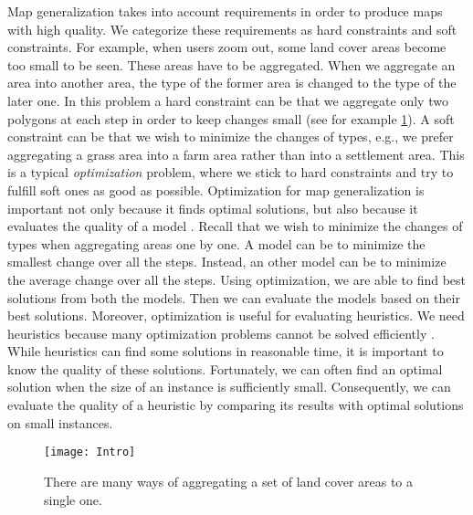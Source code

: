 Map generalization takes into account requirements
in order to produce maps with high quality.
We categorize these requirements as hard constraints 
and soft constraints.
For example, when users zoom out, 
some land cover areas become too small to be seen.
These areas have to be aggregated.
When we aggregate an area into another area, the type of the 
former area is changed to the type of the later one. 
In this problem a hard constraint can be that we aggregate only 
two polygons at each step in order to keep changes small
(see for example \fig\ref{fig:Intro_SubdivisionName}). 
A soft constraint can be that we wish to minimize the changes of 
types, e.g., we prefer aggregating a grass area into a farm 
area rather than into a settlement area.
This is a typical \emph{optimization} problem,
where we stick to hard constraints and 
try to fulfill soft ones as good as possible.
Optimization for map generalization is important 
not only because it finds optimal solutions,
but also because it evaluates the quality of a model
\parencite{Haunert2011Benchmark}.
Recall that we wish to minimize the changes of types
when aggregating areas one by one.
A model can be to minimize 
the smallest change over all the steps.
Instead, an other model can be to minimize 
the average change over all the steps.
Using optimization, we are able to find best solutions 
from both the models.
Then we can evaluate the models based on their best solutions.
Moreover, optimization is useful for evaluating heuristics.
We need heuristics because
many optimization problems cannot be solved efficiently
\parencite[e.g.,][]
{HaunertWolff2010AreaAgg,Chimani2014Eat,Haunert2016Partition}.
While heuristics can find some solutions in reasonable time,
it is important to know the quality of 
these solutions.
Fortunately, we can often find an optimal solution when 
the size of an instance is sufficiently small.
Consequently, we can evaluate the quality of a heuristic by
comparing its results with optimal solutions
on small instances.

\begin{figure}[tb]
	\centering
	\texttt{[image: Intro]}
	\caption{There are many ways of aggregating a set of land 
	cover areas to a single one.}
	\label{fig:Intro_SubdivisionName}
\end{figure}

